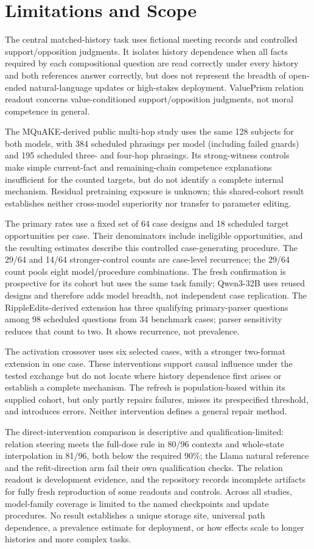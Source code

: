 \documentclass{article}
\begin{document}
\section{Limitations and Scope}
\label{app:limitations}
The central matched-history task uses fictional meeting records and controlled support/opposition judgments. It isolates history dependence when all facts required by each compositional question are read correctly under every history and both references answer correctly, but does not represent the breadth of open-ended natural-language updates or high-stakes deployment. ValuePrism relation readout concerns value-conditioned support/opposition judgments, not moral competence in general.

The MQuAKE-derived public multi-hop study uses the same 128 subjects for both models, with 384 scheduled phrasings per model (including failed guards) and 195 scheduled three- and four-hop phrasings. Its strong-witness controls make simple current-fact and remaining-chain competence explanations insufficient for the counted targets, but do not identify a complete internal mechanism. Residual pretraining exposure is unknown; this shared-cohort result establishes neither cross-model superiority nor transfer to parameter editing.

The primary rates use a fixed set of 64 case designs and 18 scheduled target opportunities per case. Their denominators include ineligible opportunities, and the resulting estimates describe this controlled case-generating procedure. The 29/64 and 14/64 stronger-control counts are case-level recurrence; the 29/64 count pools eight model/procedure combinations. The fresh confirmation is prospective for its cohort but uses the same task family; Qwen3-32B uses reused designs and therefore adds model breadth, not independent case replication. The RippleEdits-derived extension has three qualifying primary-parser questions among 98 scheduled questions from 34 benchmark cases; parser sensitivity reduces that count to two. It shows recurrence, not prevalence.

The activation crossover uses six selected cases, with a stronger two-format extension in one case. These interventions support causal influence under the tested exchange but do not locate where history dependence first arises or establish a complete mechanism. The refresh is population-based within its supplied cohort, but only partly repairs failures, misses its prespecified threshold, and introduces errors. Neither intervention defines a general repair method.

The direct-intervention comparison is descriptive and qualification-limited: relation steering meets the full-dose rule in 80/96 contexts and whole-state interpolation in 81/96, both below the required 90\%; the Llama natural reference and the refit-direction arm fail their own qualification checks. The relation readout is development evidence, and the repository records incomplete artifacts for fully fresh reproduction of some readouts and controls. Across all studies, model-family coverage is limited to the named checkpoints and update procedures. No result establishes a unique storage site, universal path dependence, a prevalence estimate for deployment, or how effects scale to longer histories and more complex tasks.
\end{document}
